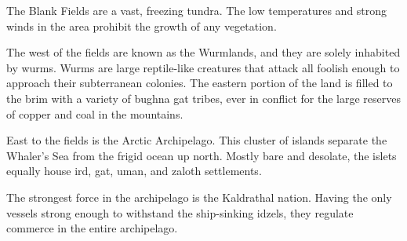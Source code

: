 The Blank Fields are a vast, freezing tundra.
The low temperatures and strong winds in the area prohibit the growth of any vegetation.

The west of the fields are known as the Wurmlands, and they are solely inhabited by wurms.
Wurms are large reptile-like creatures that attack all foolish enough to approach their subterranean colonies.
The eastern portion of the land is filled to the brim with a variety of bughna gat tribes, ever in conflict for the large reserves of copper and coal in the mountains.

East to the fields is the Arctic Archipelago.
This cluster of islands separate the Whaler's Sea from the frigid ocean up north.
Mostly bare and desolate, the islets equally house ird, gat, uman, and zaloth settlements.

The strongest force in the archipelago is the Kaldrathal nation.
Having the only vessels strong enough to withstand the ship-sinking idzels, they regulate commerce in the entire archipelago.
